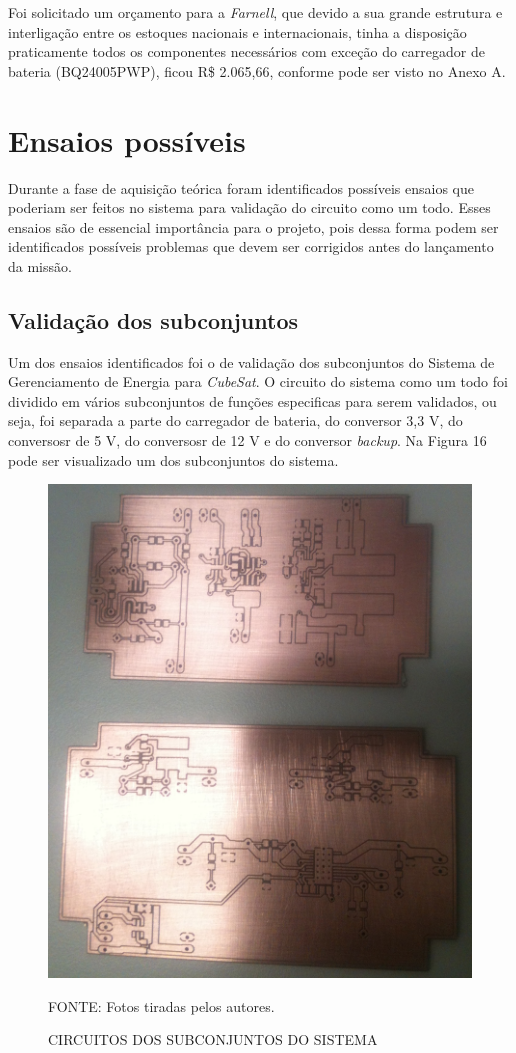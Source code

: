 \documentclass[
	12pt,				%
	openright,			%
	oneside,			%
	a4paper,			%
	english,			%
	french,				%
	spanish,			%
	brazil,				%
	oldfontcommands
	]{abntex2}
\begin{document}
	Foi solicitado um orçamento para a \textit{Farnell}, que devido a sua grande estrutura e interligação entre os estoques nacionais e internacionais, tinha a disposição praticamente todos os componentes necessários com exceção do carregador de bateria (BQ24005PWP), ficou R\$ 2.065,66, conforme pode ser visto no Anexo A.
	

\section[Ensaios possíveis]{Ensaios possíveis}
	
	Durante a fase de aquisição teórica foram identificados possíveis ensaios que poderiam ser feitos no sistema para validação do circuito como um todo. Esses ensaios são de essencial importância para o projeto, pois dessa forma podem ser identificados possíveis problemas que devem ser corrigidos antes do lançamento da missão.
	
\subsection[Validação dos subconjuntos]{Validação dos subconjuntos}

	Um dos ensaios identificados foi o de validação dos subconjuntos do Sistema de Gerenciamento de Energia para \textit{CubeSat}. O circuito do sistema como um todo foi dividido em vários subconjuntos de funções especificas para serem validados, ou seja, foi separada a parte do carregador de bateria, do conversor 3,3 V, do conversosr de 5 V, do conversosr de 12 V e do conversor \textit{backup}. Na Figura 16 pode ser visualizado um dos subconjuntos do sistema.
	
	\begin{figure}[th]
		\caption{CIRCUITOS DOS SUBCONJUNTOS DO SISTEMA}
		\centering
		\includegraphics[width=0.5\linewidth]{./figs/placas_subconjuntos}
			
		\begin{small}
			FONTE: Fotos tiradas pelos autores.
		\end{small}		
	\end{figure}
	
\end{document}
